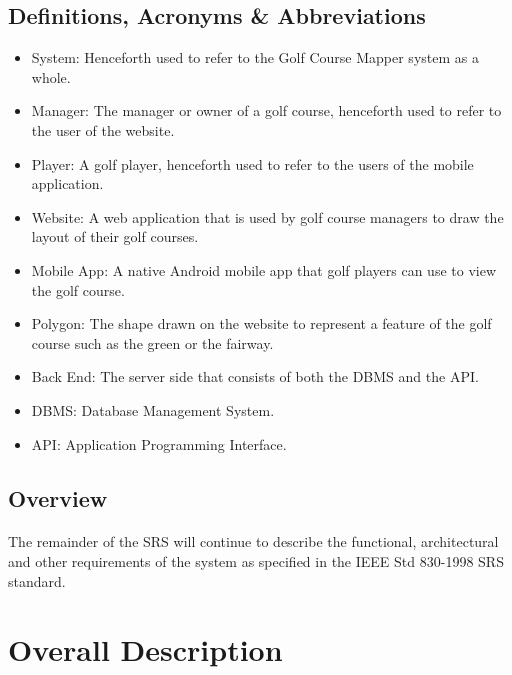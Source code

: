 \documentclass{article}
\begin{document}
    \subsection{Definitions, Acronyms \& Abbreviations}
    \begin{itemize}
        \item
            System: Henceforth used to refer to the Golf Course Mapper system
            as a whole.
        \item
            Manager: The manager or owner of a golf course, henceforth used to
            refer to the user of the website.
        \item
            Player: A golf player, henceforth used to refer to the users of the
            mobile application.
        \item
            Website: A web application that is used by golf course managers
            to draw the layout of their golf courses.
        \item
            Mobile App: A native Android mobile app that golf players can use to
            view the golf course.
        \item
            Polygon: The shape drawn on the website to represent a feature of
            the golf course such as the green or the fairway.
        \item
            Back End: The server side that consists of both the DBMS and the
            API.
        \item
            DBMS: Database Management System.
        \item
            API: Application Programming Interface.
    \end{itemize}

    \subsection{Overview}
    
    \paragraph{}
    The remainder of the SRS will continue to describe the functional,
    architectural and other requirements of the system as specified in the
    IEEE Std 830-1998 SRS standard.

    \newpage

    \section{Overall Description} 
\end{document}
